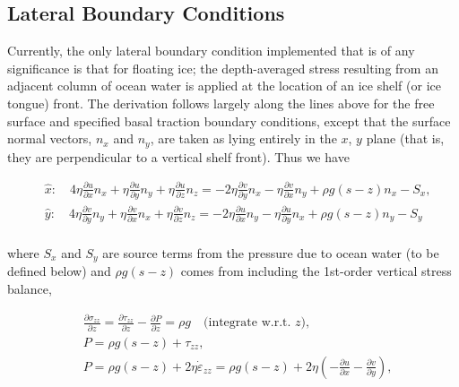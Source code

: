 
\subsection{Lateral Boundary Conditions}
Currently, the only lateral boundary condition implemented that is of any significance is that for floating ice; the depth-averaged stress resulting from an adjacent column of ocean water is applied at the location of an ice shelf (or ice tongue) front. The derivation follows largely along the lines above for the free surface and specified basal traction boundary conditions, except that the surface normal vectors, $n_{x}$ and $n_{y}$, are taken as lying entirely in the $x$, $y$ plane (that is, they are perpendicular to a vertical shelf front). Thus we have

\begin{equation}
\begin{split}
  & \hat{x}:\quad 4\eta \frac{\partial u}{\partial x}n_{x}+\eta \frac{\partial u}{\partial y}n_{y}+\eta \frac{\partial u}{\partial z}n_{z}=-2\eta \frac{\partial v}{\partial y}n_{x}-\eta \frac{\partial v}{\partial x}n_{y}+\rho g\left( s-z \right)n_{x}-S_{x}, \\ 
 & \hat{y}:\quad 4\eta \frac{\partial v}{\partial y}n_{y}+\eta \frac{\partial v}{\partial x}n_{x}+\eta \frac{\partial v}{\partial z}n_{z}=-2\eta \frac{\partial u}{\partial x}n_{y}-\eta \frac{\partial u}{\partial y}n_{x}+\rho g\left( s-z \right)n_{y}-S_{y} \\ 
\end{split}
\end{equation}

where $S_x$ and $S_y$ are source terms from the pressure due to ocean water (to be defined below) and $\rho g\left( s-z \right)$ comes from including the 1st-order vertical stress balance,

\begin{equation}
\begin{split}
  & \frac{\partial \sigma _{zz}}{\partial z}=\frac{\partial \tau _{zz}}{\partial z}-\frac{\partial P}{\partial z}=\rho g\quad \text{(integrate w}\text{.r}\text{.t}\text{. $z$)}, \\ 
 & P=\rho g\left( s-z \right)+\tau _{zz}, \\ 
 & P=\rho g\left( s-z \right)+2\eta \dot{\varepsilon }_{zz}=\rho g\left( s-z \right)+2\eta \left( -\frac{\partial u}{\partial x}-\frac{\partial v}{\partial y} \right), \\ 
\end{split}
\end{equation}

